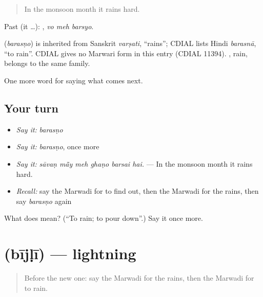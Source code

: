 \begin{quote}
In the monsoon month it rains hard.
\end{quote}

Past (it …):   , \emph{vo meh barsyo}.

\begin{cousinweb}
\textbf{} (\emph{barasṇo}) is inherited from Sanskrit \emph{varṣati}, \textquotedblleft{}rains\textquotedblright{}; CDIAL lists Hindi \emph{barasnā}, \textquotedblleft{}to rain\textquotedblright{}. CDIAL gives no Marwari form in this entry (CDIAL 11394). \textbf{}, rain, belongs to the same family.
\end{cousinweb}

\begin{grammarlens}[title={What you've built}]
One more word for saying what comes next.
\end{grammarlens}

\subsection*{Your turn}
\begin{itemize}
\raggedright
  \item \emph{Say it:} \emph{barasṇo}
  \item \emph{Say it:} \emph{barasṇo}, once more
  \item \emph{Say it:} \emph{sāvaṇ mā̃y meh ghaṇo barsai hai.} — In the monsoon month it rains hard.
  \item \emph{Recall:} say the Marwadi for to find out, then the Marwadi for the rains, then say \emph{barasṇo} again
\end{itemize}

\begin{tcolorbox}[breakable,colback=teal!4,colframe=teal!35!black,title={Before you move on}]
What does  mean? (\textquotedblleft{}To rain; to pour down\textquotedblright{}.) Say it once more.
\end{tcolorbox}
\section[\texorpdfstring{\mw{बीजळी} (bījḷī)}{बीजळी (bījḷī)}]{ (bījḷī) — lightning}

\label{lesson:MW-C221-bijli}



\begin{quote}
Before the new one: say the Marwadi for the rains, then the Marwadi for to rain.
\end{quote}

